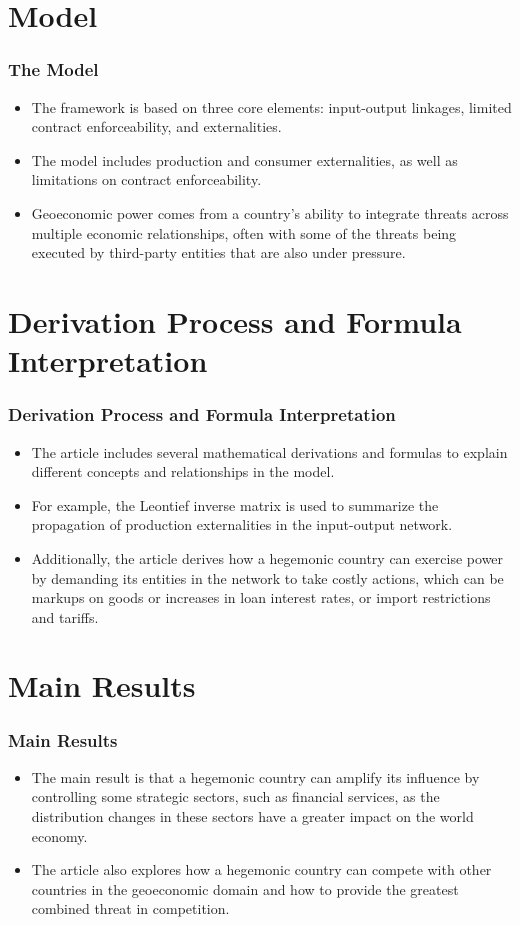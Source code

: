 \documentclass{beamer}
\begin{document}
\section{Model}

\begin{frame}
	\frametitle{The Model}
	\begin{itemize}
		\item The framework is based on three core elements: input-output linkages, limited contract enforceability, and externalities.
		\item The model includes production and consumer externalities, as well as limitations on contract enforceability.
		\item Geoeconomic power comes from a country's ability to integrate threats across multiple economic relationships, often with some of the threats being executed by third-party entities that are also under pressure.
	\end{itemize}
\end{frame}

\section{Derivation Process and Formula Interpretation}

\begin{frame}
	\frametitle{Derivation Process and Formula Interpretation}
	\begin{itemize}
		\item The article includes several mathematical derivations and formulas to explain different concepts and relationships in the model.
		\item For example, the Leontief inverse matrix is used to summarize the propagation of production externalities in the input-output network.
		\item Additionally, the article derives how a hegemonic country can exercise power by demanding its entities in the network to take costly actions, which can be markups on goods or increases in loan interest rates, or import restrictions and tariffs.
		\end{itemize}
\end{frame}

\section{Main Results}

\begin{frame}
	\frametitle{Main Results}
	\begin{itemize}
		\item The main result is that a hegemonic country can amplify its influence by controlling some strategic sectors, such as financial services, as the distribution changes in these sectors have a greater impact on the world economy.
		\item The article also explores how a hegemonic country can compete with other countries in the geoeconomic domain and how to provide the greatest combined threat in competition.
	\end{itemize}
\end{frame}
\end{document}
